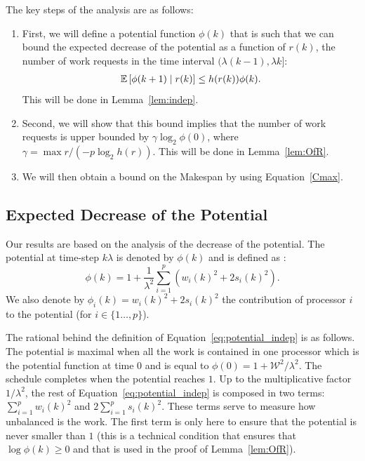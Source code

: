 The key steps of the analysis are as follows:
\begin{enumerate}
\item First, we will define a potential function $\phi(k)$ that is
  such that we can bound the expected decrease of the potential as a
  function of $r(k)$, the number of work requests in the time
  interval $(\lambda(k-1), \lambda k]$:
  \begin{align*}
    \esp{\phi(k+1)\mid r(k)} \le h(r(k))\phi(k). 
  \end{align*}
  This will be done in Lemma~\ref{lem:indep}. 
\item Second, we will show that this bound implies that the number of
  work requests is upper bounded by $\gamma\log_2\phi(0)$, where
  $\gamma=\max r/(-p\log_2h(r))$. This will be done in
  Lemma~\ref{lem:OfR}. 
\item We will then obtain a bound on the Makespan by using
  Equation~\eqref{Cmax}.
\end{enumerate}

\subsection{Expected Decrease of the Potential}

Our results are based on the analysis of the decrease of the
potential. The potential at time-step $k\lambda$ is denoted by $\phi(k)$
and is defined as :
\begin{equation}
  \label{eq:potential_indep}
  \phi(k) = 1+\frac{1}{\lambda^2}\sum_{i=1}^{p} \left(w_{i}(k)^{2} + 2s_{i}(k)^{2}\right). 
\end{equation}
We also denote by $\phi_i(k) = w_{i}(k)^{2} + 2s_{i}(k)^{2}$ the
contribution of processor $i$ to the potential (for
$i\in\{1\dots,p\}$).

The rational behind the definition of Equation~\eqref{eq:potential_indep}
is as follows. The potential is maximal when all the work is contained
in one processor which is the potential function at time $0$ and is
equal to $\phi(0) = 1+\mathcal{W}^2/\lambda^2$.  The schedule
completes when the potential reaches $1$.  Up to the multiplicative
factor $1/\lambda^2$, the rest of Equation~\eqref{eq:potential_indep}
is composed in two terms: $\sum_{i=1}^p w_{i}(k)^{2}$ and
$2\sum_{i=1}^ps_{i}(k)^{2}$. These terms serve to measure how
unbalanced is the work.  The first term is only here to ensure that the
potential is never smaller than $1$ (this is a technical condition
that ensures that $\log \phi(k)\ge0$ and that is used in the proof of
Lemma~\ref{lem:OfR}).

